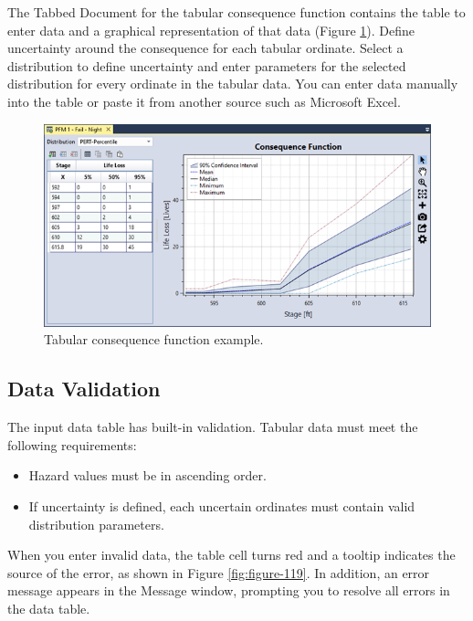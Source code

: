 \documentclass[
]{book}
\begin{document}
The Tabbed Document for the tabular consequence function contains the table to enter data and a graphical representation of that data (Figure \ref{fig:figure-118}). Define uncertainty around the consequence for each tabular ordinate. Select a distribution to define uncertainty and enter parameters for the selected distribution for every ordinate in the tabular data. You can enter data manually into the table or paste it from another source such as Microsoft Excel.

\begin{figure}

{\centering \includegraphics{images/figure118} 

}

\caption{Tabular consequence function example.}\label{fig:figure-118}
\end{figure}

\hypertarget{data-validation-3}{%
\subsection{Data Validation}\label{data-validation-3}}

The input data table has built-in validation. Tabular data must meet the following requirements:

\begin{itemize}
\item
  Hazard values must be in ascending order.
\item
  If uncertainty is defined, each uncertain ordinates must contain valid distribution parameters.
\end{itemize}

When you enter invalid data, the table cell turns red and a tooltip indicates the source of the error, as shown in Figure \ref{fig:figure-119}. In addition, an error message appears in the Message window, prompting you to resolve all errors in the data table.
\end{document}
